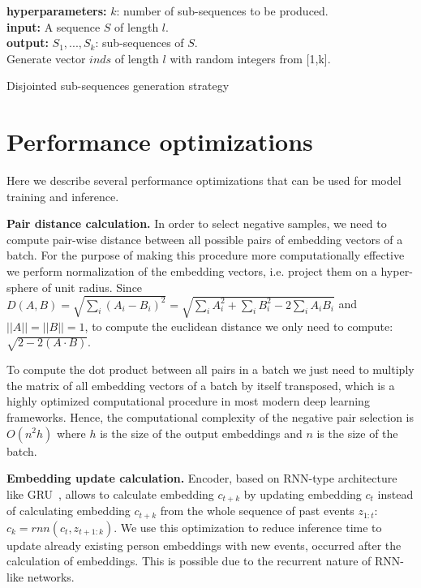 \documentclass[sigconf]{acmart}
\begin{document}
\begin{algorithm}
\SetAlgoLined
\textbf{hyperparameters:} $k$: number of sub-sequences to be produced. \\
\textbf{input:} A sequence $S$ of length $l$. \\
\textbf{output:} $S_1,...,S_k$: sub-sequences of $S$. \\

\BlankLine
Generate vector $inds$ of length $l$ with random integers from [1,k].\\
\caption{Disjointed sub-sequences generation strategy}
\label{alg-disj-ss}

\end{algorithm}

\section{Performance optimizations} \label{app-sec-perf-opt}

Here we describe several performance optimizations that can be used for model training and inference.

\textbf{Pair distance calculation.} In order to select negative samples, we need to compute pair-wise distance between all possible pairs of embedding vectors of a batch. For the purpose of making this procedure more computationally effective we perform normalization of the embedding vectors, i.e. project them on a hyper-sphere of unit radius. Since $D(A,B) = \sqrt{\sum_i(A_i - B_i)^2} = \sqrt{\sum_i A_i^2 + \sum_i B_i^2 - 2\sum_i A_i B_i} $ and $||A||= ||B||=1$, to compute the euclidean distance we only need to compute: $\sqrt{2 - 2(A \cdot B)}$.

To compute the dot product between all pairs in a batch we just need to multiply the matrix of all embedding vectors of a batch by itself transposed, which is a highly optimized computational procedure in most modern deep learning frameworks. Hence, the computational complexity of the negative pair selection is $O(n^2h)$ where $h$ is the size of the output embeddings and $n$ is the size of the batch.

\textbf{Embedding update calculation.} Encoder, based on RNN-type architecture like GRU~\citep{Cho2014LearningPR}, allows to calculate embedding $c_{t+k}$ by updating embedding $c_t$ instead of  calculating embedding $c_{t+k}$ from the whole sequence of past events $z_{1:t}$: $c_k = rnn(c_t, z_{t+1:k})$. We use this optimization to reduce inference time to update already existing person embeddings with new events, occurred after the calculation of embeddings. This is possible due to the recurrent nature of RNN-like networks.
\end{document}
